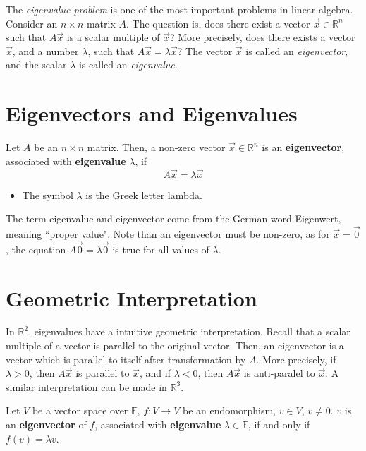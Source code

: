 \documentclass[letterpaper,12pt]{article}
\begin{document}
The \textit{eigenvalue problem} is one of the most important problems in linear algebra. Consider an $n \times n$ matrix $A$. The question is, does there exist a vector $\vec{x} \in \mathbb{R}^n$ such that $A\vec{x}$ is a scalar multiple of $\vec{x}$? More precisely, does there exists a vector $\vec{x}$, and a number $\lambda$, such that $A\vec{x} = \lambda \vec{x}$? The vector $\vec{x}$ is called an \textit{eigenvector}, and the scalar $\lambda$ is called an \textit{eigenvalue}.

\section*{Eigenvectors and Eigenvalues}
\begin{definition}
Let $A$ be an $n \times n$ matrix. Then, a non-zero vector $\vec{x} \in \mathbb{R}^n$ is an \textbf{eigenvector}, associated with \textbf{eigenvalue} $\lambda$, if
\begin{equation*}
    A\vec{x} = \lambda \vec{x}
\end{equation*}
\begin{itemize}
    \item The symbol $\lambda$ is the Greek letter lambda.
\end{itemize}
\end{definition}

The term eigenvalue and eigenvector come from the German word Eigenwert, meaning ``proper value". Note than an eigenvector must be non-zero, as for $\vec{x} = \vec{0}$, the equation $A\vec{0} = \lambda \vec{0}$ is true for all values of $\lambda$.

\section*{Geometric Interpretation}
In $\mathbb{R}^2$, eigenvalues have a intuitive geometric interpretation. Recall that a scalar multiple of a vector is parallel to the original vector. Then, an eigenvector is a vector which is parallel to itself after transformation by $A$. More precisely, if $\lambda > 0$, then $A\vec{x}$ is parallel to $\vec{x}$, and if $\lambda < 0$, then $A\vec{x}$ is anti-paralel to $\vec{x}$. A similar interpretation can be made in $\mathbb{R}^3$.


\begin{definition}
Let $V$ be a vector space over $\mathbb{F}$, $f: V \rightarrow V$ be an endomorphism, $v \in V$, $v \neq 0$. $v$ is an \textbf{eigenvector} of $f$, associated with \textbf{eigenvalue} $\lambda \in \mathbb{F}$, if and only if $f(v) = \lambda v$.
\end{definition}
\end{document}
